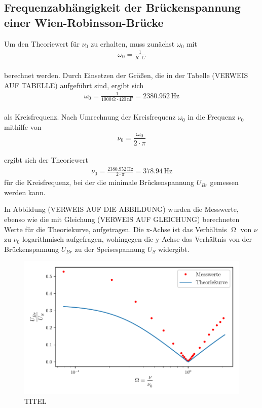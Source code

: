 \subsection{Frequenzabhängigkeit der Brückenspannung einer Wien-Robinsson-Brücke}



Um den Theoriewert für $\nu_{0}$ zu erhalten, muss zunächst $\omega_{0}$ mit 
\begin{align}
\omega_{0} = \frac{1}{R \cdot C} \nonumber
\end{align}
\\ 
berechnet werden. Durch Einsetzen der Größen, die in der Tabelle (VERWEIS AUF TABELLE) 
aufgeführt sind, ergibt sich
\begin{align}
\omega_{0} = \frac{1}{1000\, \si{\ohm} \cdot 420\, \si{\nano\farad}} = 2380.952\, \si{\hertz}
\end{align}
\\ 
als Kreisfrequenz. Nach Umrechnung der Kreisfrequenz $\omega_{0}$ in die Frequenz $\nu_{0}$ mithilfe von 
\begin{equation}
\nu_{0} = \frac{\omega_{0}}{2 \cdot \pi}
\end{equation}
\\
ergibt sich der Theoriewert 
\begin{align}
\nu_{0} = \frac{2380.952\, \si{\hertz}}{2 \cdot \pi} = 378.94\, \si{\hertz}
\end{align}
für die Kreisfrequenz, bei der die minimale Brückenspannung $U_{Br}$ gemessen werden kann.

In Abbildung (VERWEIS AUF DIE ABBILDUNG) wurden die Messwerte, ebenso wie die mit Gleichung (VERWEIS AUF GLEICHUNG) 
berechneten Werte für die Theoriekurve, aufgetragen. Die x-Achse ist das Verhältnis $\upOmega$ von $\nu$ zu $\nu_{0}$ 
logarithmisch aufgefragen, wohingegen die y-Achse das Verhältnis von der Brückenspannung $U_{Br}$ zu der Speisespannung
$U_{S}$ widergibt.





\noindent
\begin{figure}
  \centering
  \includegraphics{plot.pdf}
   \caption{TITEL}
   \label{fig:plot}
\end{figure}

